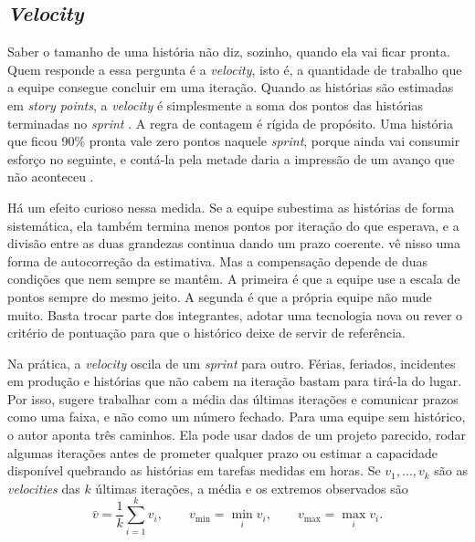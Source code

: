 
\subsection{\textit{Velocity}}
\label{sub:velocity}

Saber o tamanho de uma história não diz, sozinho, quando ela vai ficar pronta.
Quem responde a essa pergunta é a \textit{velocity}, isto é, a quantidade de
trabalho que a equipe consegue concluir em uma iteração. Quando as histórias são
estimadas em \textit{story points}, a \textit{velocity} é simplesmente a soma dos
pontos das histórias terminadas no \textit{sprint} \cite{cohn2005}. A regra de
contagem é rígida de propósito. Uma história que ficou 90\% pronta vale zero
pontos naquele \textit{sprint}, porque ainda vai consumir esforço no seguinte, e
contá-la pela metade daria a impressão de um avanço que não aconteceu
\cite{cohn2005}.

Há um efeito curioso nessa medida. Se a equipe subestima as histórias de forma
sistemática, ela também termina menos pontos por iteração do que esperava, e a
divisão entre as duas grandezas continua dando um prazo coerente.
 vê nisso uma forma de autocorreção da estimativa. Mas a
compensação depende de duas condições que nem sempre se mantêm. A primeira é que
a equipe use a escala de pontos sempre do mesmo jeito. A segunda é que a própria
equipe não mude muito. Basta trocar parte dos integrantes, adotar uma tecnologia
nova ou rever o critério de pontuação para que o histórico deixe de servir de
referência.

Na prática, a \textit{velocity} oscila de um \textit{sprint} para outro. Férias,
feriados, incidentes em produção e histórias que não cabem na iteração bastam
para tirá-la do lugar. Por isso,  sugere trabalhar com a
média das últimas iterações e comunicar prazos como uma faixa, e não como um
número fechado. Para uma equipe sem histórico, o autor aponta três caminhos.
Ela pode usar dados de um projeto parecido, rodar algumas iterações antes de
prometer qualquer prazo ou estimar a capacidade disponível quebrando as
histórias em tarefas medidas em horas. Se $v_1, \dots, v_k$ são as
\textit{velocities} das $k$ últimas iterações, a média e os extremos observados
são
%
\begin{equation}
  \bar{v} = \frac{1}{k}\sum_{i=1}^{k} v_i, \qquad
  v_{\min} = \min_i v_i, \qquad
  v_{\max} = \max_i v_i .
  \label{eq:velocity}
\end{equation}

